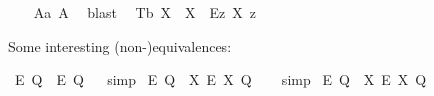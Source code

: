 \begin{isabellebody}
%
\ \ %
%
\isamarkupfalse%
\ A{}a\ A{}\ \isamarkupfalse%
\ blast\ %
%
%
\isanewline
%
\isamarkupfalse%
\ T{}b{\isacharcolon}\ {\isachardoublequoteopen}{\isasymlfloor}\isactrlbold {\isasymforall}X{\isacharcolon}{\isacharcolon}{\isasymup}{\isasymlangle}{\isasymzero}{\isasymrangle}{\isachardot}\ {\isasymP}\ {\isasymdown}X\ \isactrlbold {\isasymrightarrow}\ \isactrlbold {\isasymdiamond}{\isacharparenleft}\isactrlbold {\isasymexists}\isactrlsup Ez{\isachardot}\ X\ z{\isacharparenright}{\isasymrfloor}{\isachardoublequoteclose}\ \isanewline
\ \ \isamarkupfalse%
%
\ %
%
\isamarkupfalse%
\ %
%
%
%
%
\begin{isamarkuptext}%
Some interesting (non-)equivalences:%
\end{isamarkuptext}\isamarkuptrue%
\isamarkupfalse%
\ {\isachardoublequoteopen}{\isasymlfloor}\isactrlbold {\isasymbox}\isactrlbold {\isasymexists}\isactrlsup E\ {\isacharparenleft}Q{\isacharcolon}{\isacharcolon}{\isasymup}{\isasymlangle}{\isasymzero}{\isasymrangle}{\isacharparenright}\ \isactrlbold {\isasymleftrightarrow}\ \isactrlbold {\isasymbox}{\isacharparenleft}\isactrlbold {\isasymexists}\isactrlsup E\ \isactrlbold {\isasymdown}Q{\isacharparenright}{\isasymrfloor}{\isachardoublequoteclose}%
\ %
%
\isamarkupfalse%
\ simp%
%
%
\isanewline
{}\isamarkupfalse%
\ {\isachardoublequoteopen}{\isasymlfloor}\isactrlbold {\isasymbox}\isactrlbold {\isasymexists}\isactrlsup E\ {\isacharparenleft}Q{\isacharcolon}{\isacharcolon}{\isasymup}{\isasymlangle}{\isasymzero}{\isasymrangle}{\isacharparenright}\ \isactrlbold {\isasymleftrightarrow}\ {\isacharparenleft}{\isacharparenleft}{\isasymlambda}X{\isachardot}\ \isactrlbold {\isasymbox}\isactrlbold {\isasymexists}\isactrlsup E\ X{\isacharparenright}\ Q{\isacharparenright}{\isasymrfloor}{\isachardoublequoteclose}%
\ \ %
%
\isamarkupfalse%
\ simp%
%
%
\isanewline
{}\isamarkupfalse%
\ {\isachardoublequoteopen}{\isasymlfloor}\isactrlbold {\isasymbox}\isactrlbold {\isasymexists}\isactrlsup E\ {\isacharparenleft}Q{\isacharcolon}{\isacharcolon}{\isasymup}{\isasymlangle}{\isasymzero}{\isasymrangle}{\isacharparenright}\ \isactrlbold {\isasymleftrightarrow}\ {\isacharparenleft}{\isacharparenleft}{\isasymlambda}X{\isachardot}\ \isactrlbold {\isasymbox}\isactrlbold {\isasymexists}\isactrlsup E\ \isactrlbold {\isasymdown}X{\isacharparenright}\ Q{\isacharparenright}{\isasymrfloor}{\isachardoublequoteclose}%

\end{isabellebody}
